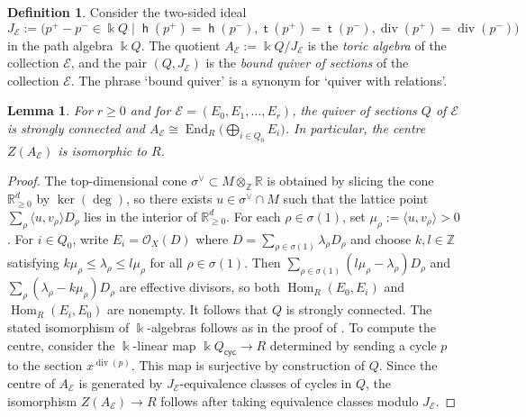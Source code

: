 \documentclass[11pt,a4paper]{amsart}
\numberwithin{equation}{section}
\newtheorem{lemma}[theorem]{Lemma}
\theoremstyle{definition}
\newtheorem{definition}[theorem]{Definition}
\theoremstyle{remark}
\newcommand{\kk}{\ensuremath{\Bbbk}}
\newcommand{\RR}{\ensuremath{\mathbb{R}}}
\newcommand{\ZZ}{\ensuremath{\mathbb{Z}}}
\renewcommand{\div}{\operatorname{div}}
\newcommand{\head}{\operatorname{\mathsf{h}}}
\newcommand{\tail}{\operatorname{\mathsf{t}}}
\newcommand{\End}{\operatorname{End}}
\newcommand{\Hom}{\operatorname{Hom}}
\newcommand{\Ker}{\operatorname{ker}}
\begin{document}
\begin{definition}
Consider the two-sided ideal 
  \[
  J_{\mathscr{E}}:= \big( p^+-p^- \in \kk Q \mid \head(p^+)=\head(p^-),
 \tail(p^+)=\tail(p^-), \div(p^+) = \div(p^-)\big)
 \]
 in the path algebra $\kk Q$. The quotient $A_{\mathscr{E}}:= \kk Q/J_{\mathscr{E}}$ is the \emph{toric algebra} of the collection $\mathscr{E}$, and the pair $(Q,J_{\mathscr{E}})$ is the \emph{bound quiver of sections} of the collection $\mathscr{E}$. The phrase `bound quiver' is a synonym for `quiver with relations'.
 \end{definition}

 \begin{lemma}
 \label{lem:algebra}
 For $r\geq 0$ and for $\mathscr{E}=(E_0,E_1,\dots,E_r)$, the quiver of sections $Q$ of $\mathscr{E}$ is strongly connected and $A_{\mathscr{E}}\cong \End_R\bigl( \bigoplus_{i\in Q_0} E_i \bigr)$. In particular, the centre $Z(A_{\mathscr{E}})$ is isomorphic to $R$.
 \end{lemma}
 \begin{proof}
 The top-dimensional cone $\sigma^\vee\subset M\otimes_\ZZ \RR$ is obtained by slicing the cone $\RR^d_{\geq 0}$ by $\Ker(\deg)$, so there exists $u\in \sigma^\vee\cap M$ such that the lattice point $\sum_\rho \langle u,v_\rho\rangle D_\rho$ lies in the interior of $\RR^d_{\geq 0}$. For each $\rho\in \sigma(1)$, set $\mu_\rho:= \langle u,v_\rho\rangle >0$. For $i\in Q_0$, write $E_i=\mathcal{O}_X(D)$ where $D=\sum_{\rho\in \sigma(1)} \lambda_\rho D_\rho$ and choose $k, l\in \ZZ$ satisfying $k\mu_\rho\leq \lambda_\rho\leq l\mu_\rho$ for all $\rho\in \sigma(1)$. Then $\sum_{\rho\in \sigma(1)} (l\mu_\rho-\lambda_\rho)D_\rho$ and $\sum_\rho (\lambda_\rho-k\mu_\rho)D_\rho$ are effective divisors, so both $\Hom_R(E_0,E_i)$ and $\Hom_R(E_i,E_0)$ are nonempty. It follows that $Q$ is strongly connected. The stated isomorphism of $\kk$-algebras follows as in the proof of \cite[Proposition~3.3]{CrawSmith}. To compute the centre, consider the $\kk$-linear map $\kk Q_{\mathsf{cyc}}\to R$ determined by sending a cycle $p$ to the section $x^{\div(p)}$. This map is surjective by construction of $Q$.  Since the centre of $A_{\mathscr{E}}$ is generated by $J_{\mathscr{E}}$-equivalence classes of cycles in $Q$,  the isomorphism $Z(A_{\mathscr{E}})\to R$ follows after taking equivalence classes modulo $J_{\mathscr{E}}$.
  \end{proof} 
  
  
  
  
 
\end{document}
